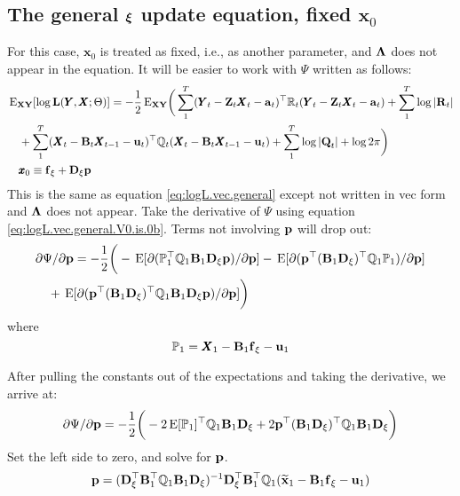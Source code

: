 \documentclass[]{article}
\def\xixi{\mbox{\boldmath $\xi$}}
\def\LAM{\mbox{\boldmath $\Lambda$}}
\def\UPS{\mbox{\boldmath $\Upsilon$}}
\def\XI{\mbox{\boldmath $\Xi$}}
\def\BB{\mbox{$\mathbf B$}}	\def\bb{\mbox{$\mathbf b$}} \def\Bb{\mbox{$\mathbf J$}} \def\Ba{\mbox{$\mathbf L$}} \def\Bm{\UPS}
\def\DD{\mbox{$\mathbf D$}}	\def\dd{\mbox{$\mathbf d$}}
\def\E{\,\textup{\textrm{E}}}
\def\EXy{\,\textup{\textrm{E}}_{\text{{\bf XY}}}}
\def\LL{\mbox{$\mathbf L$}}	\def\ll{\mbox{$\mathbf l$}}
\def\QQ{\mbox{$\mathbf Q$}}	 \def\qq{\mbox{$\mathbf q$}} \def\Qb{\mbox{$\mathbf G$}}  \def\Qm{\mathbb{Q}}
\def\RR{\mbox{$\mathbf R$}}	 \def\rr{\mbox{$\mathbf r$}} \def\Rb{\mbox{$\mathbf H$}}	\def\Rm{\mathbb{R}}
\def\XX{\mbox{$\pmb{X}$}}	\def\xx{\mbox{$\pmb{x}$}}
\def\YY{\mbox{$\pmb{Y}$}}	\def\yy{\mbox{$\pmb{y}$}}
\def\ZZ{\mbox{$\mathbf Z$}}	\def\zz{\mbox{$\mathbf z$}}	\def\Zb{\mbox{$\mathbf M$}} \def\Za{\mbox{$\mathbf N$}} \def\Zm{\XI}
\def\hatxone{\widetilde{\mbox{$\mathbf x$}}_1}
\begin{document}
\subsection{The general $\xixi$ update equation, fixed $\xx_0$}\label{sec:xi.constrained.x0}
For this case, $\xx_0$ is treated as fixed, i.e., as another parameter, and $\LAM$ does not appear in the equation. It will be easier to work with $\Psi$ written as follows:
\begin{equation}\label{eq:logL.vec.general.V0.is.0b}
\begin{split}
&\EXy[\log\LL(\YY,\XX ; \Theta)] = -\frac{1}{2}\EXy\bigg(
 \sum_1^T(\YY_t - \ZZ_t\XX_t - \aa_t)^\top \Rm_t(\YY_t - \ZZ_t\XX_t - \aa_t)
 +\sum_1^T \log |\RR_t|\\
&\quad +\sum_1^T(\XX_t - \BB_t\XX_{t-1} - \uu_t)^\top \Qm_t (\XX_t - \BB_t\XX_{t-1} - \uu_t)
 +\sum_1^T\log |\QQ_t| + \log 2\pi\bigg)\\
&\quad \xx_0 \equiv \ff_\xi+\DD_\xi\pp  
\end{split}
\end{equation}
This is the same as equation \ref{eq:logL.vec.general} except not written in vec form and $\LAM$ does not appear.  Take the derivative of $\Psi$ using equation \ref{eq:logL.vec.general.V0.is.0b}. Terms not involving $\mbox{$\mathbf p$}$ will drop out:
\begin{equation}\label{eq:pi.constrained.V0.is.0}
\begin{split}
&\partial\Psi/\partial\pp = -\frac{1}{2} \bigg( -\E[\partial(\mathbb{P}_1^\top\Qm_1\BB_1\DD_\xi\pp)/\partial\pp]  -\E[\partial(\pp^\top(\BB_1\DD_\xi)^\top\Qm_1\mathbb{P}_1)/\partial\pp] \\
&\quad +\E[\partial(\pp^\top(\BB_1\DD_\xi)^\top\Qm_1\BB_1\DD_\xi\pp)/\partial\pp]  
\bigg)
\end{split}
\end{equation}
where
\begin{equation}
\mathbb{P}_1=\XX_1 - \BB_1\ff_\xi  - \uu_1
\end{equation}

After pulling the constants out of the expectations and taking the derivative, we arrive at:
\begin{equation}
\begin{split}
\partial\Psi/\partial\pp = -\frac{1}{2} \bigg( - 2\E[\mathbb{P}_1]^\top\Qm_1\BB_1\DD_\xi
+ 2\pp^\top(\BB_1\DD_\xi)^\top\Qm_1\BB_1\DD_\xi  
\bigg)
\end{split}
\end{equation}
Set the left side to zero, and solve for $\mbox{$\mathbf p$}$.
\begin{equation}\label{eq:pi.constrained.V0.is.0.4}
\pp = (\DD_\xi^\top\BB_1^\top\Qm_1\BB_1\DD_\xi)^{-1}\DD_\xi^\top\BB_1^\top\Qm_1(\hatxone - \BB_1\ff_\xi  - \uu_1)
\end{equation}
\end{document}
